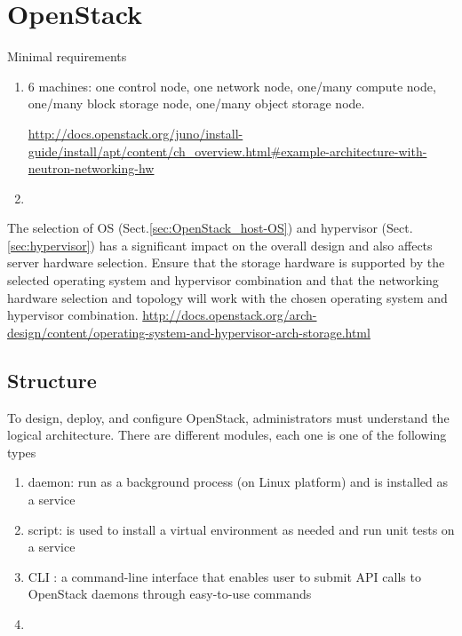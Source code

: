\chapter{OpenStack}
\label{chap:OpenStack}


Minimal requirements
\begin{enumerate}
  \item 6 machines: one control node, one network node, one/many compute node,
  one/many block storage node, one/many object storage node.
  
  \url{http://docs.openstack.org/juno/install-guide/install/apt/content/ch_overview.html#example-architecture-with-neutron-networking-hw}
  
  \item 
\end{enumerate}

The selection of OS (Sect.\ref{sec:OpenStack_host-OS}) and hypervisor
(Sect.\ref{sec:hypervisor}) has a significant impact on the overall design and
also affects server hardware selection.
Ensure that the storage hardware is supported by the selected operating system
and hypervisor combination and that the networking hardware selection and
topology will work with the chosen operating system and hypervisor combination. 
\url{http://docs.openstack.org/arch-design/content/operating-system-and-hypervisor-arch-storage.html}



\section{Structure}

To design, deploy, and configure OpenStack, administrators must understand the
logical architecture. There are different modules, each one is one of the
following types

\begin{enumerate}
  \item daemon: run as a background process (on Linux platform) and is installed
  as a service
  
  \item script: is used to install a virtual environment as needed and run unit
  tests on a service
  
  \item CLI : a command-line interface that enables user to submit API calls to
  OpenStack daemons through easy-to-use commands
  
  \item 
\end{enumerate}



